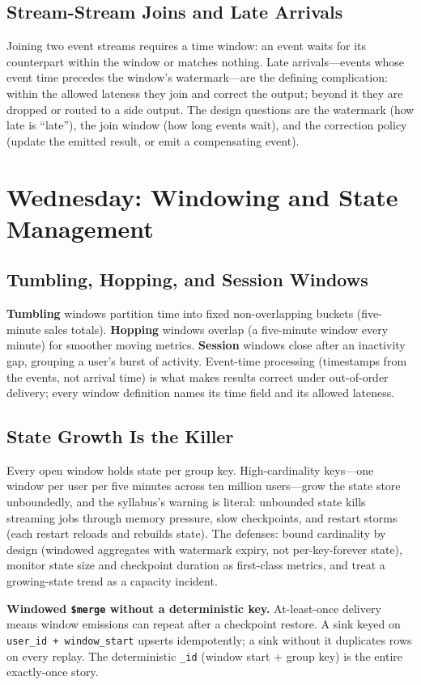 \subsection{Stream-Stream Joins and Late Arrivals}
Joining two event streams requires a time window: an event waits for its counterpart within the window or matches nothing. Late arrivals---events whose event time precedes the window's watermark---are the defining complication: within the allowed lateness they join and correct the output; beyond it they are dropped or routed to a side output. The design questions are the watermark (how late is ``late''), the join window (how long events wait), and the correction policy (update the emitted result, or emit a compensating event).

\section{Wednesday: Windowing and State Management}
\subsection{Tumbling, Hopping, and Session Windows}
\textbf{Tumbling} windows partition time into fixed non-overlapping buckets (five-minute sales totals). \textbf{Hopping} windows overlap (a five-minute window every minute) for smoother moving metrics. \textbf{Session} windows close after an inactivity gap, grouping a user's burst of activity. Event-time processing (timestamps from the events, not arrival time) is what makes results correct under out-of-order delivery; every window definition names its time field and its allowed lateness.

\subsection{State Growth Is the Killer}
Every open window holds state per group key. High-cardinality keys---one window per user per five minutes across ten million users---grow the state store unboundedly, and the syllabus's warning is literal: unbounded state kills streaming jobs through memory pressure, slow checkpoints, and restart storms (each restart reloads and rebuilds state). The defenses: bound cardinality by design (windowed aggregates with watermark expiry, not per-key-forever state), monitor state size and checkpoint duration as first-class metrics, and treat a growing-state trend as a capacity incident.

\begin{pitfall}
\textbf{Windowed \texttt{\$merge} without a deterministic key.} At-least-once delivery means window emissions can repeat after a checkpoint restore. A sink keyed on \texttt{user\_id + window\_start} upserts idempotently; a sink without it duplicates rows on every replay. The deterministic \texttt{\_id} (window start + group key) is the entire exactly-once story.
\end{pitfall}

